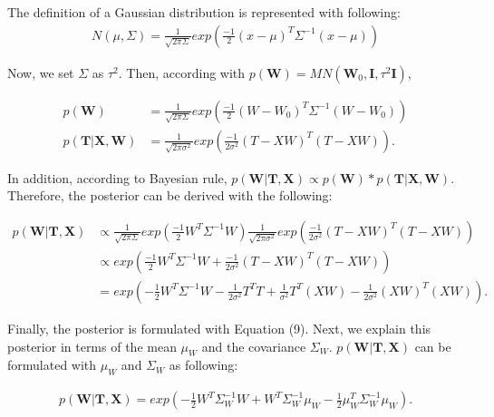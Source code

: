 \documentclass[12pt,letterpaper]{article}
\begin{document}
The definition of a Gaussian distribution is represented with following:
\begin{equation}
\begin{split}
N(\mu, \Sigma)=\frac{1}{\sqrt{2\pi\Sigma}}exp(\frac{-1}{2}(x-\mu)^T\Sigma^{-1}(x-\mu))
\end{split}
\end{equation}

Now, we set $\Sigma$ as $\tau^2$. Then, according with
$p(\textbf{W})=MN(\textbf{W}_0, \textbf{I}, \tau^2\textbf{I})$,

\begin{equation}
\begin{split}
p(\textbf{W})&=\frac{1}{\sqrt{2\pi\Sigma}}exp(\frac{-1}{2}(W-W_0)^T\Sigma^{-1}(W-W_0)) \\
p(\textbf{T}|\textbf{X}, \textbf{W})& = \frac{1}{\sqrt{2\pi\sigma^2}}exp(\frac{-1}{2\sigma^2}(T-XW)^T(T-XW)).
\end{split}
\end{equation}

In addition, according to Bayesian rule, $p(\textbf{W} | \textbf{T}, \textbf{X}) \propto p(\textbf{W}) * p(\textbf{T}|\textbf{X}, \textbf{W})$.
Therefore, the posterior can be derived with the following:

\begin{equation}
\begin{split}
p(\textbf{W} | \textbf{T}, \textbf{X})& \propto 
\frac{1}{\sqrt{2\pi\Sigma}}exp(\frac{-1}{2}W^T\Sigma^{-1}W)\frac{1}{\sqrt{2\pi\sigma^2}}exp(\frac{-1}{2\sigma^2}(T-XW)^T(T-XW)) \\
& \propto exp(\frac{-1}{2}W^T\Sigma^{-1}W + \frac{-1}{2\sigma^2}(T-XW)^T(T-XW))\\
& = exp(-\frac{1}{2}W^T\Sigma^{-1}W - \frac{1}{2\sigma^2}T^TT + \frac{1}{\sigma^2}T^T(XW) - \frac{1}{2\sigma^2}(XW)^T(XW)).
\end{split}
\end{equation}

Finally, the posterior is formulated with Equation (9).
Next, we explain this posterior in terms of the mean $\mu_W$ and the covariance $\Sigma_W$. 
$p(\textbf{W} | \textbf{T}, \textbf{X})$ can be formulated with $\mu_W$ and $\Sigma_W$ as following:

\begin{equation}
\begin{split}
p(\textbf{W} | \textbf{T}, \textbf{X})
= exp(-\frac{1}{2}W^T\Sigma_{W}^{-1}W
+ W^T\Sigma_{W}^{-1}\mu_W -\frac{1}{2}\mu_W^T\Sigma_{W}^{-1}\mu_W).
\end{split}
\end{equation}
\end{document}
